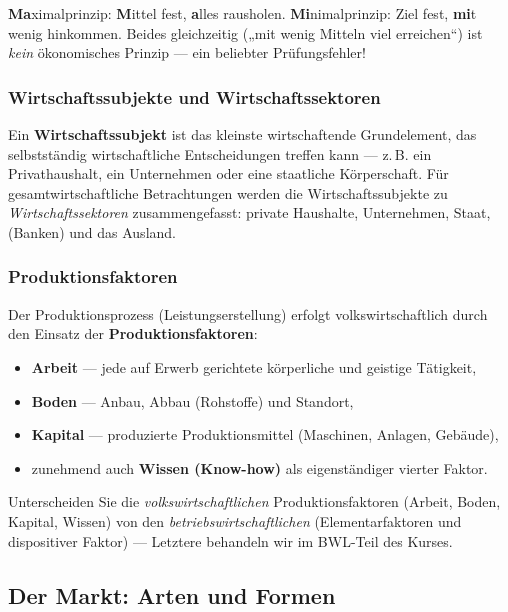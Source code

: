 \documentclass[11pt, a4paper]{article}
\begin{document}
\begin{eselsbruecke}
\textbf{Ma}ximalprinzip: \textbf{M}ittel fest, \textbf{a}lles rausholen.
\textbf{Mi}nimalprinzip: Ziel fest, \textbf{mi}t wenig hinkommen.
Beides gleichzeitig („mit wenig Mitteln viel erreichen``) ist \emph{kein} ökonomisches
Prinzip --- ein beliebter Prüfungsfehler!
\end{eselsbruecke}

\subsubsection{Wirtschaftssubjekte und Wirtschaftssektoren}

Ein \textbf{Wirtschaftssubjekt} ist das kleinste wirtschaftende Grundelement, das
selbstständig wirtschaftliche Entscheidungen treffen kann --- z.\,B. ein Privathaushalt,
ein Unternehmen oder eine staatliche Körperschaft. Für gesamtwirtschaftliche Betrachtungen
werden die Wirtschaftssubjekte zu \emph{Wirtschaftssektoren} zusammengefasst: private
Haushalte, Unternehmen, Staat, (Banken) und das Ausland.

\subsubsection{Produktionsfaktoren}

Der Produktionsprozess (Leistungserstellung) erfolgt volkswirtschaftlich durch den Einsatz
der \textbf{Produktionsfaktoren}:

\begin{itemize}
  \item \textbf{Arbeit} --- jede auf Erwerb gerichtete körperliche und geistige Tätigkeit,
  \item \textbf{Boden} --- Anbau, Abbau (Rohstoffe) und Standort,
  \item \textbf{Kapital} --- produzierte Produktionsmittel (Maschinen, Anlagen, Gebäude),
  \item zunehmend auch \textbf{Wissen (Know-how)} als eigenständiger vierter Faktor.
\end{itemize}

\begin{merksatz}
Unterscheiden Sie die \emph{volkswirtschaftlichen} Produktionsfaktoren (Arbeit, Boden,
Kapital, Wissen) von den \emph{betriebswirtschaftlichen} (Elementarfaktoren und dispositiver
Faktor) --- Letztere behandeln wir im BWL-Teil des Kurses.
\end{merksatz}

\subsection{Der Markt: Arten und Formen}
\end{document}
